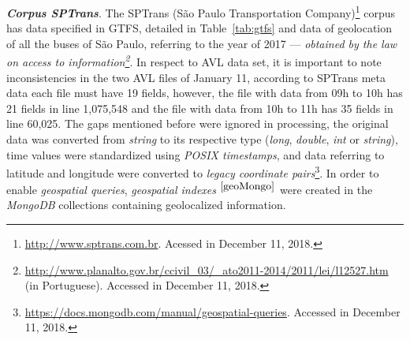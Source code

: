\documentclass[runningheads]{llncs}
\newcommand{\footref}[1]{%
    $^{\ref{#1}}$%
}
\begin{document}
\textbf{\textit{{Corpus} SPTrans}}. The SPTrans (São Paulo Transportation Company)\footnote{\url{http://www.sptrans.com.br}. Acessed in December 11, 2018.} corpus has data specified in GTFS, detailed in Table~\ref{tab:gtfs} and data of geolocation of all the buses of São Paulo, referring to the year of 2017 --- \emph{obtained by the law on access to information\footnote{\url{http://www.planalto.gov.br/ccivil_03/_ato2011-2014/2011/lei/l12527.htm} (in Portuguese). Accessed in December 11, 2018.}}. In respect to AVL data set, it is important to note inconsistencies in the two AVL files of January 11, according to SPTrans meta data each file must have 19 fields, however, the file with data from 09h to 10h has 21 fields in line 1,075,548 and the file with data from 10h to 11h has 35 fields in line 60,025. The gaps mentioned before were ignored in processing, the original data was converted from \textit{string} to its respective type (\textit{long}, \textit {double}, \textit{int} or \textit{string}), time values were standardized using \textit{POSIX timestamps}, and data referring to latitude and longitude were converted to \textit {legacy coordinate pairs}\footnote {\label{geoMongo}\url {https://docs.mongodb.com/manual/geospatial-queries}. Accessed in December 11, 2018.}. In order to enable \textit{geospatial queries}, \textit{geospatial indexes}\footref{geoMongo} were created in the \textit{MongoDB} collections containing geolocalized information.
\end{document}

